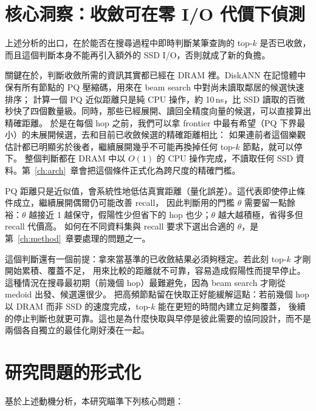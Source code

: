 \section{核心洞察：收斂可在零 I/O 代價下偵測}
\label{sec:mot-insight}

上述分析的出口，在於能否在搜尋過程中即時判斷某筆查詢的 top-$k$ 是否已收斂，而且這個判斷本身不能再引入額外的 SSD I/O，否則就成了新的負擔。

關鍵在於，判斷收斂所需的資訊其實都已經在 DRAM 裡。DiskANN 在記憶體中保有所有節點的 PQ 壓縮碼，用來在 beam search 中對尚未讀取鄰居的候選快速排序；
計算一個 PQ 近似距離只是純 CPU 操作，約 10\,ns，比 SSD 讀取的百微秒快了四個數量級。同時，那些已經展開、讀回全精度向量的候選，可以直接算出精確距離。
於是在每個 hop 之前，我們可以拿 frontier 中最有希望（PQ 下界最小）的未展開候選，去和目前已收斂候選的精確距離相比：
如果連前者這個樂觀估計都已明顯劣於後者，繼續展開幾乎不可能再換掉任何 top-$k$ 節點，就可以停下。
整個判斷都在 DRAM 中以 $O(1)$ 的 CPU 操作完成，不讀取任何 SSD 資料。第~\ref{ch:arch}~章會把這個條件正式化為跨尺度的精確門檻。

PQ 距離只是近似值，會系統性地低估真實距離（量化誤差）。這代表即使停止條件成立，繼續展開偶爾仍可能改善 recall，
因此判斷用的門檻 $\theta$ 需要留一點餘裕：$\theta$ 越接近 1 越保守，假陽性少但省下的 hop 也少；$\theta$ 越大越積極，省得多但 recall 代價高。
如何在不同資料集與 recall 要求下選出合適的 $\theta$，是第~\ref{ch:method}~章要處理的問題之一。

這個判斷還有一個前提：拿來當基準的已收斂結果必須夠穩定。若此刻 top-$k$ 才剛開始累積、覆蓋不足，
用來比較的距離就不可靠，容易造成假陽性而提早停止。這種情況在搜尋最初期（前幾個 hop）最難避免，因為 beam search 才剛從 medoid 出發、候選還很少。
把高頻節點留在快取正好能緩解這點：若前幾個 hop 以 DRAM 而非 SSD 的速度完成，top-$k$ 能在更短的時間內建立足夠覆蓋，
後續的停止判斷也就更可靠。這也是為什麼快取與早停是彼此需要的協同設計，而不是兩個各自獨立的最佳化剛好湊在一起。

\section{研究問題的形式化}
\label{sec:mot-rq}

基於上述動機分析，本研究瞄準下列核心問題：

